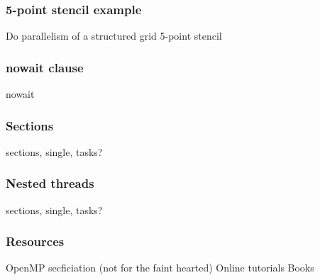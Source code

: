 \documentclass{beamer}
\begin{document}
\begin{frame}
\frametitle{5-point stencil example}
Do parallelism of a structured grid 5-point stencil
\end{frame}

\begin{frame}
\frametitle{nowait clause}
nowait
\end{frame}

\begin{frame}
\frametitle{Sections}
sections, single, tasks?
\end{frame}

\begin{frame}
\frametitle{Nested threads}
sections, single, tasks?
\end{frame}

\begin{frame}
\frametitle{Resources}
OpenMP secficiation (not for the faint hearted)
Online tutorials
Books
\end{frame}

\end{document}
